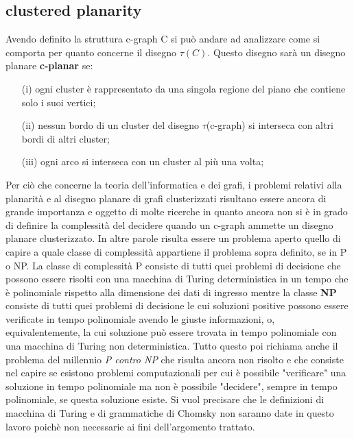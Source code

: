 \subsection{clustered planarity}
Avendo definito la struttura c-graph C si può andare ad analizzare come si comporta per quanto concerne il disegno $\tau(C)$. 
Questo disegno sarà un disegno planare \textbf{c-planar} se:\\
\begin{itemize}
	\item[(i)] ogni cluster è rappresentato da una singola regione del piano che contiene solo i suoi vertici;
	\item[(ii)] nessun bordo di un cluster del disegno $\tau$(c-graph) si interseca con altri bordi di altri cluster;
	\item[(iii)] ogni arco si interseca con un cluster al più una volta;
\end{itemize}
Per ciò che concerne la teoria dell'informatica e dei grafi, i problemi relativi alla planarità e al disegno planare di grafi clusterizzati risultano essere ancora di grande importanza e oggetto di molte ricerche in quanto ancora non si è in grado di definire la complessità del decidere quando un c-graph ammette un disegno planare clusterizzato.
In altre parole risulta essere un problema aperto quello di capire a quale classe di complessità appartiene il problema sopra definito, se in P o NP. La classe di complessità P consiste di tutti quei problemi di decisione che possono essere risolti con una macchina di Turing deterministica in un tempo che è polinomiale rispetto alla dimensione dei dati di ingresso mentre la classe \textbf{NP} consiste di tutti quei problemi di decisione le cui soluzioni positive possono essere verificate in tempo polinomiale avendo le giuste informazioni, o, equivalentemente, la cui soluzione può essere trovata in tempo polinomiale con una macchina di Turing non deterministica. Tutto questo poi richiama anche il problema del millennio \textit{P contro NP} che risulta ancora non risolto e che consiste nel capire se esistono problemi computazionali per cui è possibile "verificare" una soluzione in tempo polinomiale ma non è possibile "decidere", sempre in tempo polinomiale, se questa soluzione esiste. 
Si vuol precisare che le definizioni di macchina di Turing e di grammatiche di Chomsky non saranno date in questo lavoro poichè non necessarie ai fini dell'argomento trattato.
